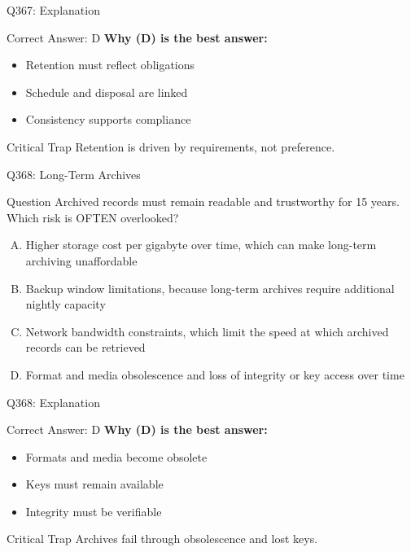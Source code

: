 \documentclass{beamer}
\begin{document}
	\begin{frame}{Q367: Explanation}
		\begin{block}{Correct Answer: D}
			\textbf{Why (D) is the best answer:}
			\begin{itemize}
				\item Retention must reflect obligations
				\item Schedule and disposal are linked
				\item Consistency supports compliance
			\end{itemize}
		\end{block}
		\begin{alertblock}{Critical Trap}
			Retention is driven by requirements, not preference.
		\end{alertblock}
	\end{frame}
	
	\begin{frame}{Q368: Long-Term Archives}
		\begin{block}{Question}
			\small Archived records must remain readable and trustworthy for 15 years. Which risk is OFTEN overlooked?
		\end{block}
		\begin{enumerate}[(A)]
			\footnotesize
			\item Higher storage cost per gigabyte over time, which can make long-term archiving unaffordable
			\item Backup window limitations, because long-term archives require additional nightly capacity
			\item Network bandwidth constraints, which limit the speed at which archived records can be retrieved
			\item Format and media obsolescence and loss of integrity or key access over time
		\end{enumerate}
	\end{frame}
	
	\begin{frame}{Q368: Explanation}
		\begin{block}{Correct Answer: D}
			\textbf{Why (D) is the best answer:}
			\begin{itemize}
				\item Formats and media become obsolete
				\item Keys must remain available
				\item Integrity must be verifiable
			\end{itemize}
		\end{block}
		\begin{alertblock}{Critical Trap}
			Archives fail through obsolescence and lost keys.
		\end{alertblock}
	\end{frame}
		
\end{document}

